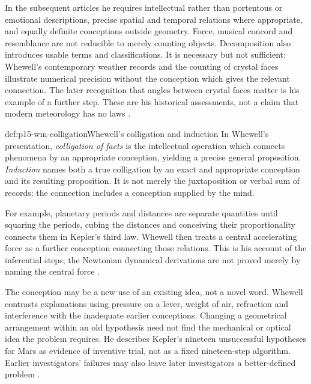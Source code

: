 In the subsequent articles he requires intellectual rather than portentous
or emotional descriptions, precise spatial and temporal relations where
appropriate, and equally definite conceptions outside geometry.
Force, musical concord and resemblance are not reducible to merely counting
objects. Decomposition also introduces usable terms and classifications.
It is necessary but not sufficient: Whewell's contemporary weather records
and the counting of crystal faces illustrate numerical precision without
the conception which gives the relevant connection. The later recognition
that angles between crystal faces matter is his example of a further step.
These are his historical assessments, not a claim that modern meteorology
has no laws
\parencite[II.III.4--11, pp.~54--58]{Whewell1858NovumPG}.

\begin{hbdefinition}{def:p15-wm-colligation}{Whewell's colligation and induction}
In Whewell's presentation, \emph{colligation of facts} is the intellectual
operation which connects phenomena by an appropriate conception, yielding
a precise general proposition. \emph{Induction} names both a true
colligation by an exact and appropriate conception and its resulting
proposition. It is not merely the juxtaposition or verbal sum of records:
the connection includes a conception supplied by the mind.
\end{hbdefinition}

For example, planetary periods and distances are separate quantities until
squaring the periods, cubing the distances and conceiving their
proportionality connects them in Kepler's third law. Whewell then treats
a central accelerating force as a further conception connecting those
relations. This is his account of the inferential steps; the Newtonian
dynamical derivations are not proved merely by naming the central force
\parencite[II.IV.1, pp.~59--60; II.V.1--3, pp.~71--76]{Whewell1858NovumPG}.

The conception may be a new use of an existing idea, not a novel word.
Whewell contrasts explanations using pressure on a lever, weight of air,
refraction and interference with the inadequate earlier conceptions.
Changing a geometrical arrangement within an old hypothesis need not find
the mechanical or optical idea the problem requires.
He describes Kepler's nineteen unsuccessful hypotheses for Mars as
evidence of inventive trial, not as a fixed nineteen-step algorithm.
Earlier investigators' failures may also leave later investigators a
better-defined problem
\parencite[II.IV.6--9, pp.~63--66]{Whewell1858NovumPG}.


